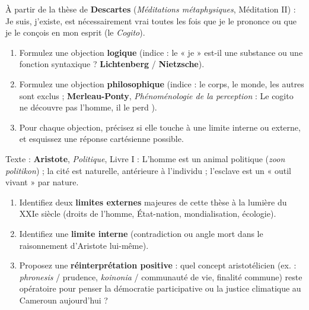 \documentclass[11pt]{article}
\begin{document}
\begin{exercice}
À partir de la thèse de \textbf{Descartes} (\emph{Méditations métaphysiques}, Méditation II) : \guillemotleft Je suis, j'existe, est nécessairement vrai toutes les fois que je le prononce ou que je le conçois en mon esprit \guillemotright (le \emph{Cogito}).
\begin{enumerate}
    \item Formulez une objection \textbf{logique} (indice : le « je » est-il une substance ou une fonction syntaxique ? \textbf{Lichtenberg} / \textbf{Nietzsche}).
    \item Formulez une objection \textbf{philosophique} (indice : le corps, le monde, les autres sont exclus ; \textbf{Merleau-Ponty}, \emph{Phénoménologie de la perception} : \guillemotleft Le cogito ne découvre pas l'homme, il le perd \guillemotright).
    \item Pour chaque objection, précisez si elle touche à une limite interne ou externe, et esquissez une réponse cartésienne possible.
\end{enumerate}
\end{exercice}

\begin{exercice}
Texte : \textbf{Aristote}, \emph{Politique}, Livre I : \guillemotleft L'homme est un animal politique \guillemotright (\emph{zoon politikon}) ; la cité est naturelle, antérieure à l'individu ; l'esclave est un « outil vivant » par nature.
\begin{enumerate}
    \item Identifiez deux \textbf{limites externes} majeures de cette thèse à la lumière du XXIe siècle (droits de l'homme, État-nation, mondialisation, écologie).
    \item Identifiez une \textbf{limite interne} (contradiction ou angle mort dans le raisonnement d'Aristote lui-même).
    \item Proposez une \textbf{réinterprétation positive} : quel concept aristotélicien (ex. : \emph{phronesis} / prudence, \emph{koinonia} / communauté de vie, finalité commune) reste opératoire pour penser la démocratie participative ou la justice climatique au Cameroun aujourd'hui ?
\end{enumerate}
\end{exercice}
\end{document}
